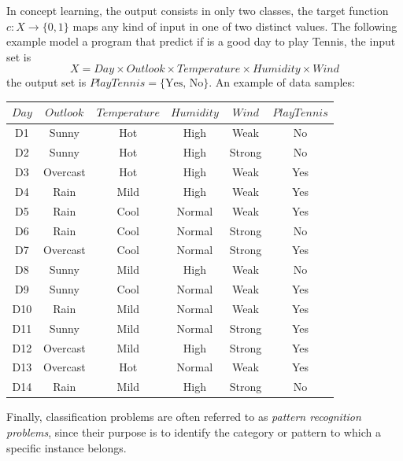 \documentclass[10pt, letterpaper]{report}
\begin{document}
In concept learning, the output consists in only two classes, the target function $c:X\rightarrow\{0,1\}$ maps any kind of input in one of two distinct values. The following example model a program that predict if is a good day to play Tennis, the input set is $$
	X=Day\times Outlook \times Temperature \times Humidity \times Wind
$$
the output set is $PlayTennis=\{\text{Yes, No}\}$. An example of data samples:\begin{center}
	\begin{tabular}{cccccc}
		\toprule
		$Day$ & $Outlook$ & $Temperature$ & $Humidity$ & $Wind$ & $PlayTennis$ \\
		\midrule
		D1    & Sunny     & Hot           & High       & Weak   & No           \\
		D2    & Sunny     & Hot           & High       & Strong & No           \\
		D3    & Overcast  & Hot           & High       & Weak   & Yes          \\
		D4    & Rain      & Mild          & High       & Weak   & Yes          \\
		D5    & Rain      & Cool          & Normal     & Weak   & Yes          \\
		D6    & Rain      & Cool          & Normal     & Strong & No           \\
		D7    & Overcast  & Cool          & Normal     & Strong & Yes          \\
		D8    & Sunny     & Mild          & High       & Weak   & No           \\
		D9    & Sunny     & Cool          & Normal     & Weak   & Yes          \\
		D10   & Rain      & Mild          & Normal     & Weak   & Yes          \\
		D11   & Sunny     & Mild          & Normal     & Strong & Yes          \\
		D12   & Overcast  & Mild          & High       & Strong & Yes          \\
		D13   & Overcast  & Hot           & Normal     & Weak   & Yes          \\
		D14   & Rain      & Mild          & High       & Strong & No           \\
		\bottomrule
	\end{tabular}
\end{center}

\newpage
\bigskip
Finally, classification problems are often referred to as \textit{pattern recognition problems},
since their purpose is to identify the category or pattern to which a specific instance belongs.
\end{document}
